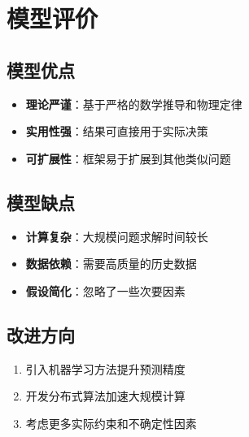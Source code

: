 \newpage
\section{模型评价}

\subsection{模型优点}
\begin{itemize}
    \item \textbf{理论严谨}：基于严格的数学推导和物理定律
    \item \textbf{实用性强}：结果可直接用于实际决策
    \item \textbf{可扩展性}：框架易于扩展到其他类似问题
\end{itemize}

\subsection{模型缺点}
\begin{itemize}
    \item \textbf{计算复杂}：大规模问题求解时间较长
    \item \textbf{数据依赖}：需要高质量的历史数据
    \item \textbf{假设简化}：忽略了一些次要因素
\end{itemize}

\subsection{改进方向}
\begin{enumerate}
    \item 引入机器学习方法提升预测精度
    \item 开发分布式算法加速大规模计算
    \item 考虑更多实际约束和不确定性因素
\end{enumerate}
